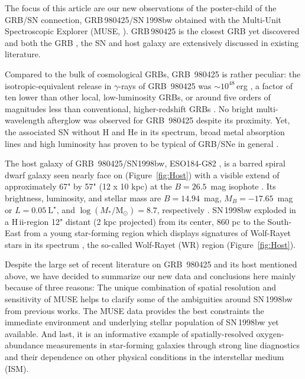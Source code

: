 \documentclass[traditabstract]{aa}
\newcommand{\hii}{\mbox{H\,{\sc ii}}}
\begin{document}
The focus of this article are our new observations of the poster-child of the GRB/SN connection, GRB\,980425/SN\,1998bw obtained with the Multi-Unit Spectroscopic Explorer (MUSE, \citealp{2010SPIE.7735E..08B}). GRB\,980425 is the closest GRB yet discovered and both the GRB \citep[e.g.][]{1998Natur.395..670G, 1998Natur.395..663K}, the SN \citep[e.g.][]{1998Natur.395..672I, 2001ApJ...555..900P, 2006ApJ...640..854M} and host galaxy \citep[e.g.][]{2000ApJ...542L..89F, 2005NewA...11..103S, 2006A&A...454..103H, 2009ApJ...693..347M, 2014A&A...562A..70M, 2016arXiv160901742M} are extensively discussed in existing literature. 

Compared to the bulk of cosmological GRBs, GRB~980425 is rather peculiar: the isotropic-equivalent release in $\gamma$-rays of GRB~980425 was $\sim10^{48}$\,erg \citep{1998Natur.395..670G}, a factor of ten lower than other local, low-luminosity GRBs, or around five orders of magnitudes less than conventional, higher-redshift GRBs \citep{2013ApJ...776...98X}. No bright multi-wavelength afterglow was observed for GRB~980425 despite its proximity. Yet, the associated SN without H and He in its spectrum, broad metal absorption lines and high luminosity has proven to be typical of GRB/SNe in general \citep{2012grbu.book..169H}.

The host galaxy of GRB~980425/SN1998bw, ESO184-G82 \citep{1989spce.book.....L}, is a barred spiral dwarf galaxy \citep{2000ApJ...542L..89F} seen nearly face on (Figure~\ref{fig:Host}) with a visible extend of approximately 67" by 57" (12 x 10 kpc) at the $B=26.5$~mag isophote \citep{2005NewA...11..103S}. Its brightness, luminosity, and stellar mass are $B=14.94$~mag, $M_B=-17.65$~mag or $L=0.05~\mathrm{L}^{\star}$, and $\log (M_{*}/\mathrm{M}_{\odot})= 8.7 $, respectively \citep{2005NewA...11..103S, 2014A&A...562A..70M}. SN\,1998bw exploded in a \hii-region 12" distant (2 kpc projected) from its center, 860 pc to the South-East from a young star-forming region which displays signatures of Wolf-Rayet stars in its spectrum \citep{2006A&A...454..103H}, the so-called Wolf-Rayet (WR) region (Figure~\ref{fig:Host}).

Despite the large set of recent literature on GRB~980425 and its host mentioned above, we have decided to summarize our new data and conclusions here mainly because of three reasons: The unique combination of spatial resolution and sensitivity of MUSE helps to clarify some of the ambiguities around SN\,1998bw from previous works. The MUSE data provides the best constraints the immediate environment and underlying stellar population of SN\,1998bw yet available. And last, it is an informative example of spatially-resolved oxygen-abundance measurements in star-forming galaxies through strong line diagnostics and their dependence on other physical conditions in the interstellar medium (ISM).
\end{document}
